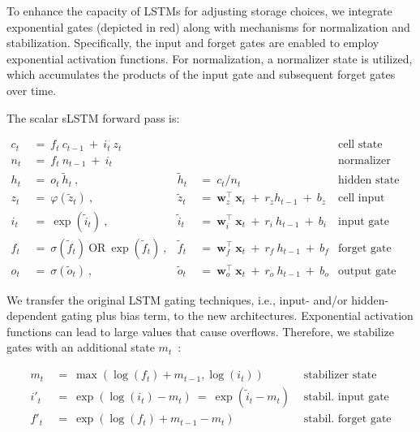 To enhance the capacity of LSTMs for adjusting storage choices, we integrate exponential gates (depicted in red) along with mechanisms for normalization and stabilization. Specifically, the input and forget gates are enabled to employ exponential activation functions. For normalization, a normalizer state is utilized, which accumulates the products of the input gate and subsequent forget gates over time.

The scalar sLSTM forward pass is:

\begin{align}
\label{eq:slstmforward}
c_t \ &= \  f_t \ c_{t-1} \ + \ i_t \ z_t & & 
 &\text{cell state} \\
n_t \ &= \  f_t \ n_{t-1} \ + \ i_t  & & 
 &\text{normalizer state} \\
h_t \ &= \ o_t \ \tilde{h}_t \ ,
  &\tilde{h}_t \ &= \ c_t / n_t
&\text{hidden state} \\
z_t \ &= \ \varphi \left( \tilde{z}_t \right) \ , 
  &\tilde{z}_t \ &=  \ \mathbf{w}^\top_{z} \ \mathbf{x}_t \ + \
  r_{z}  h_{t-1} \ + \  b_{z}
  &\text{cell input} \\
i_t \ &= \ \!\exp \left( \tilde{i}_t  \right) \ , 
  &\tilde{i}_t \ &= \ \mathbf{w}^\top_{i} \ \mathbf{x}_t \ + \
  r_{i}  \ h_{t-1} \ + \  b_{i}
  &\text{input gate} \\
f_t \ &= \ \sigma \left(  \tilde{f}_t \right) \ \text{OR} \
\!\exp \left(  \tilde{f}_t \right) \ ,
  &\tilde{f}_t \ &= \ \mathbf{w}^\top_{f} \ \mathbf{x}_t  \ + \
  r_{f}  \ h_{t-1} \ + \  b_{f}
  &\text{forget gate} \\
o_t \ &= \ \sigma \left( \tilde{o}_t \right) \ , 
  &\tilde{o}_t  \ &= \ \mathbf{w}^\top_{o} \ \mathbf{x}_t \ + \
  r_{o}  \ h_{t-1} \ + \  b_{o}
  &\text{output gate} 
\end{align}

We transfer the original LSTM gating techniques, i.e., input- and/or hidden-dependent gating plus bias term, to the new architectures. Exponential activation functions can lead to large values that cause overflows. Therefore, we stabilize gates with an additional state \mbox{$m_t$~\citep{Milakov:18arxiv}}:

\begin{align}
\label{eq:slstmstabil}
m_t \ &= \ \max \left( \log ( f_t ) + m_{t-1} , \log ( i_t ) \right) &\text{stabilizer state} \\
i'_t \ &= \ \!\exp \left( \log \left ( i_t \right) - m_t \right) \ = \ \!\exp \left( \tilde{i}_t - m_t \right) \ \, 
  &\text{stabil. input gate} \\
f'_t \ &= \ \!\exp \left( \log \left( f_t \right) + m_{t-1} - m_t \right) \ \, 
  &\text{stabil. forget gate}
\end{align}

